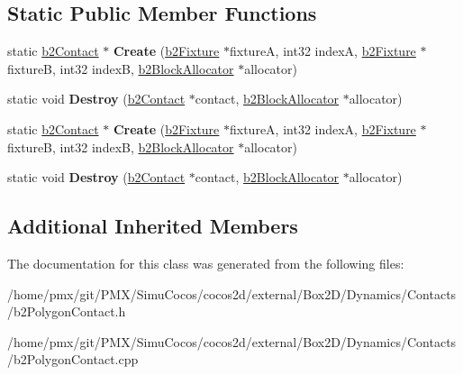 \subsection*{Static Public Member Functions}
\begin{DoxyCompactItemize}
\item 
\mbox{\label{classb2PolygonContact_a65356af432d877838e14755c5eb3c553}} 
static \hyperlink{classb2Contact}{b2\+Contact} $\ast$ {\bfseries Create} (\hyperlink{classb2Fixture}{b2\+Fixture} $\ast$fixtureA, int32 indexA, \hyperlink{classb2Fixture}{b2\+Fixture} $\ast$fixtureB, int32 indexB, \hyperlink{classb2BlockAllocator}{b2\+Block\+Allocator} $\ast$allocator)
\item 
\mbox{\label{classb2PolygonContact_a0cb55fd6af6f49d36c3cda15ffd96e63}} 
static void {\bfseries Destroy} (\hyperlink{classb2Contact}{b2\+Contact} $\ast$contact, \hyperlink{classb2BlockAllocator}{b2\+Block\+Allocator} $\ast$allocator)
\item 
\mbox{\label{classb2PolygonContact_a6f72e00b9f4870b214477073be35f592}} 
static \hyperlink{classb2Contact}{b2\+Contact} $\ast$ {\bfseries Create} (\hyperlink{classb2Fixture}{b2\+Fixture} $\ast$fixtureA, int32 indexA, \hyperlink{classb2Fixture}{b2\+Fixture} $\ast$fixtureB, int32 indexB, \hyperlink{classb2BlockAllocator}{b2\+Block\+Allocator} $\ast$allocator)
\item 
\mbox{\label{classb2PolygonContact_a8f9687ed70a02550095cf80d3bbefc92}} 
static void {\bfseries Destroy} (\hyperlink{classb2Contact}{b2\+Contact} $\ast$contact, \hyperlink{classb2BlockAllocator}{b2\+Block\+Allocator} $\ast$allocator)
\end{DoxyCompactItemize}
\subsection*{Additional Inherited Members}


The documentation for this class was generated from the following files\+:\begin{DoxyCompactItemize}
\item 
/home/pmx/git/\+P\+M\+X/\+Simu\+Cocos/cocos2d/external/\+Box2\+D/\+Dynamics/\+Contacts/b2\+Polygon\+Contact.\+h\item 
/home/pmx/git/\+P\+M\+X/\+Simu\+Cocos/cocos2d/external/\+Box2\+D/\+Dynamics/\+Contacts/b2\+Polygon\+Contact.\+cpp\end{DoxyCompactItemize}
